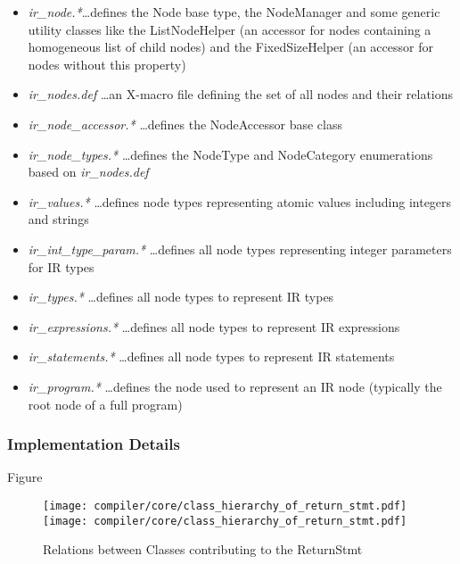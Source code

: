 \begin{itemize}
  \item \textit{ir\_node.*}\ldots defines the Node base type, the NodeManager
  and some generic utility classes like the ListNodeHelper (an accessor for
  nodes containing a homogeneous list of child nodes) and the FixedSizeHelper
  (an accessor for nodes without this property)
  \item \textit{ir\_nodes.def} \ldots an X-macro file defining the set of all
  nodes and their relations
  \item \textit{ir\_node\_accessor.*} \dots defines the NodeAccessor base class
  \item \textit{ir\_node\_types.*} \ldots defines the NodeType and NodeCategory
  enumerations based on \textit{ir\_nodes.def}
  \item \textit{ir\_values.*} \dots defines node types representing atomic
  values including integers and strings
  \item \textit{ir\_int\_type\_param.*} \ldots defines all node types
  representing integer parameters for IR types
  \item \textit{ir\_types.*} \ldots defines all node types to represent IR types
  \item \textit{ir\_expressions.*} \ldots defines all node types to represent IR
  expressions
  \item \textit{ir\_statements.*} \ldots defines all node types to represent IR
  statements
  \item \textit{ir\_program.*} \ldots defines the node used to represent an IR
  node (typically the root node of a full program)
\end{itemize}


\subsubsection{Implementation Details}
Figure 

\begin{figure}[h]
	\centering
	\texttt{[image: compiler/core/class\_hierarchy\_of\_return\_stmt.pdf]}
	\texttt{[image: compiler/core/class\_hierarchy\_of\_return\_stmt.pdf]}
	\label{fig:Compiler.Core.Classes.CallExpr}
	\caption{Relations between Classes contributing to the ReturnStmt}
\end{figure}


